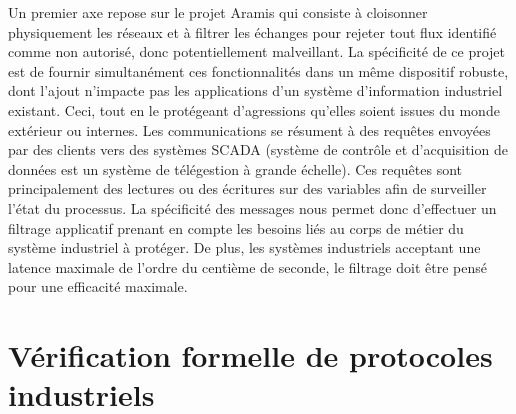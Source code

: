\documentclass{article}
\newcommand{\aramis}{Aramis}
\begin{document}
Un premier axe repose sur le projet \aramis{} \cite{aramis} qui consiste à
cloisonner physiquement les réseaux et à filtrer les échanges pour rejeter tout
flux identifié comme non autorisé, donc potentiellement malveillant.
La spécificité de ce projet est de fournir simultanément ces fonctionnalités
dans un même dispositif robuste, dont l'ajout n'impacte pas les applications
d'un système d'information industriel existant.
Ceci, tout en le protégeant d'agressions qu'elles soient issues du monde
extérieur ou internes.
Les communications se résument à des requêtes envoyées par des clients vers des
systèmes SCADA (système de contrôle et d'acquisition de données est un système
de télégestion à grande échelle).
Ces requêtes sont principalement des lectures ou des écritures sur des variables
afin de surveiller l'état du processus.
La spécificité des messages nous permet donc d'effectuer un filtrage applicatif
prenant en compte les besoins liés au corps de métier du système industriel à
protéger.
De plus, les systèmes industriels acceptant une latence maximale de l'ordre du
centième de seconde, le filtrage doit être pensé pour une efficacité maximale.

%        

\section{Vérification formelle de protocoles industriels}
\end{document}
